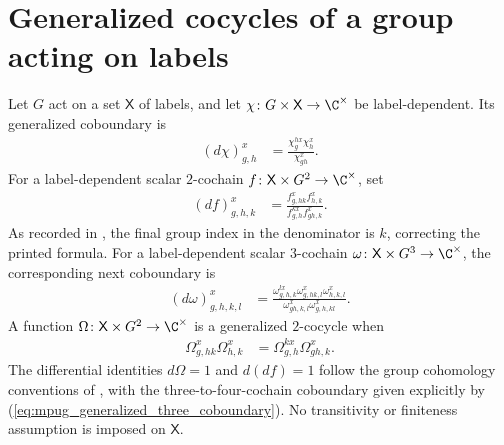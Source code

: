 \section{Generalized cocycles of a group acting on labels}
\label{sec:projective_generalized}

\begin{definition}
    \label{def:mpug_generalized_cocycle}
    \leanok
    Let $G$ act on a set $\mathsf X$ of labels, and let
    $\chi\colon G\times\mathsf X\to\C^\times$ be label-dependent. Its
    generalized coboundary is
    \begin{align}
        (d\chi)^x_{g,h}
         & =\frac{\chi^{h x}_g\chi^x_h}{\chi^x_{gh}}.
        \label{eq:mpug_generalized_coboundary}
    \end{align}
    For a label-dependent scalar $2$-cochain
    $f\colon\mathsf X\times G^2\to\C^\times$, set
    \begin{align}
        (df)^x_{g,h,k}
         & =\frac{f^x_{g,hk}f^x_{h,k}}
            {f^{k x}_{g,h}f^x_{gh,k}}.
        \label{eq:mpug_generalized_two_coboundary}
    \end{align}
    As recorded in \cite{gap:fbc25_two_cochain_coboundary_index_typo}, the
    final group index in the denominator is $k$, correcting the printed
    formula. For a label-dependent scalar $3$-cochain
    $\omega\colon\mathsf X\times G^3\to\C^\times$, the corresponding next
    coboundary is
    \begin{align}
        (d\omega)^x_{g,h,k,l}
         & =\frac{\omega^{l x}_{g,h,k}\omega^x_{g,hk,l}
                \omega^x_{h,k,l}}
            {\omega^x_{gh,k,l}\omega^x_{g,h,kl}}.
        \label{eq:mpug_generalized_three_coboundary}
    \end{align}
    A function $\Omega\colon\mathsf X\times G^2\to\C^\times$ is a
    generalized $2$-cocycle when
    \begin{align}
        \Omega^x_{g,hk}\Omega^x_{h,k}
         & =\Omega^{k x}_{g,h}\Omega^x_{gh,k}.
        \label{eq:mpug_generalized_cocycle}
    \end{align}
    The differential identities $d\Omega=1$ and $d(df)=1$ follow the group
    cohomology conventions of
    \cite[lines~5914--5922]{FrancoRubio2025MPUGauging}, with the
    three-to-four-cochain coboundary given explicitly by
    (\ref{eq:mpug_generalized_three_coboundary}).
    No transitivity or finiteness assumption is imposed on $\mathsf X$.

\end{definition}


